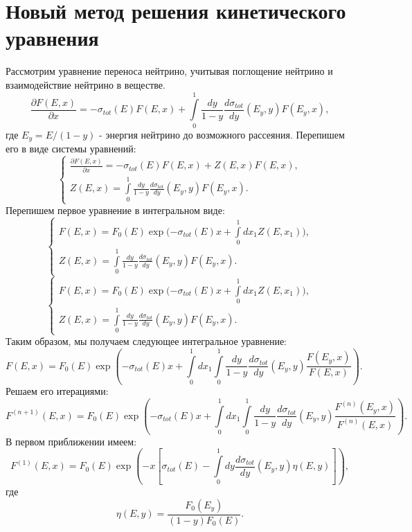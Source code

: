 \section{Новый метод решения кинетического уравнения}
Рассмотрим уравнение переноса нейтрино, учитывая поглощение нейтрино и взаимодействие нейтрино в веществе.
\begin{equation}
    \frac{\partial F(E, x)}{\partial x} = -\sigma_{tot}(E)F(E, x) + \int\limits_{0}^1\frac{dy}{1-y}\frac{d\sigma_{tot}}{dy}(E_y, y)F(E_y, x), 
\end{equation}
где $E_y = E/(1-y)$ - энергия нейтрино до возможного рассеяния. Перепишем его в виде системы уравнений:
\begin{equation}
    \begin{cases}
         \frac{\partial F(E, x)}{\partial x} = -\sigma_{tot}(E)F(E, x) + Z(E, x)F(E, x),\\
          Z(E, x) = \int\limits_{0}^1\frac{dy}{1-y}\frac{d\sigma_{tot}}{dy}(E_y, y)F(E_y, x).
    \end{cases}
\end{equation}
Перепишем первое уравнение в интегральном виде:
\begin{equation}
    \begin{cases}
          F(E, x) = F_0(E)\exp{(-\sigma_{tot}(E)x + \int\limits_{0}^1dx_1Z(E, x_1)}),\\
          Z(E, x) = \int\limits_{0}^1\frac{dy}{1-y}\frac{d\sigma_{tot}}{dy}(E_y, y)F(E_y, x).
    \end{cases}
\end{equation}
\begin{equation}
    \begin{cases}
          F(E, x) = F_0(E)\exp{(-\sigma_{tot}(E)x + \int\limits_{0}^1dx_1Z(E, x_1)}),\\
          Z(E, x) = \int\limits_{0}^1\frac{dy}{1-y}\frac{d\sigma_{tot}}{dy}(E_y, y)F(E_y, x).
    \end{cases}
\end{equation}
Таким образом, мы получаем следующее интегральное уравнение: 
\begin{equation}
          F(E, x) = F_0(E)\exp{\left(-\sigma_{tot}(E)x + \int\limits_{0}^1dx_1 \int\limits_{0}^1\frac{dy}{1-y}\frac{d\sigma_{tot}}{dy}(E_y, y)\frac{F(E_y, x)}{F(E,x)}\right)}.
\end{equation}
Решаем его итерациями: 
\begin{equation}
          F^{(n+1)}(E, x) = F_0(E)\exp{\left(-\sigma_{tot}(E)x + \int\limits_{0}^1dx_1 \int\limits_{0}^1\frac{dy}{1-y}\frac{d\sigma_{tot}}{dy}(E_y, y)\frac{F^{(n)}(E_y, x)}{F^{(n)}(E,x)}\right)}.
\end{equation}
В первом приближении имеем: 
\begin{equation}
          F^{(1)}(E, x) = F_0(E)\exp{\left(-x\left[\sigma_{tot}(E) -\int\limits_{0}^1dy\frac{d\sigma_{tot}}{dy}(E_y, y)\eta(E, y)\right]\right)},
\end{equation}
где 
\begin{equation}
    \eta(E,y) = \frac{F_0(E_y)}{(1-y)F_0(E)}.
\end{equation}
